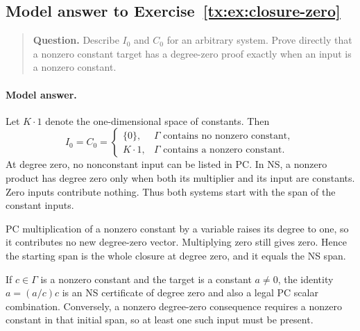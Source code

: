 \documentclass[11pt,a4paper,oneside,openany]{book}
\theoremstyle{definition}\newtheorem{definition}[theorem]{Definition}
\theoremstyle{remark}\newtheorem{remark}[theorem]{Remark}
\numberwithin{equation}{chapter}
\begin{document}
\begin{samepage}

\subsection*{Model answer to Exercise~\ref{tx:ex:closure-zero}}\label{tx:ans:closure-zero}

\begin{quote}\small\textbf{Question.} Describe $I_0$ and $C_0$ for an arbitrary system. Prove directly that a
nonzero constant target has a degree-zero proof exactly when an input
is a nonzero constant.
\end{quote}

\paragraph{Model answer.}
Let \(K\cdot1\) denote the one-dimensional space of constants.
Then
\[
 I_0=C_0=
 \begin{cases}
   \{0\},&\Gamma\text{ contains no nonzero constant},\\
   K\cdot1,&\Gamma\text{ contains a nonzero constant}.
 \end{cases}
\]
At degree zero, no nonconstant input can be listed in PC. In NS,
a nonzero product has degree zero only when both its multiplier
and its input are constants. Zero inputs contribute nothing.
Thus both systems start with the span of the constant inputs.
\end{samepage}

PC multiplication of a nonzero constant by a variable raises its
degree to one, so it contributes no new degree-zero vector. Multiplying
zero still gives zero. Hence the starting span is the whole closure
at degree zero, and it equals the NS span.

If \(c\in\Gamma\) is a nonzero constant and the target is a constant
\(a\ne0\), the identity \(a=(a/c)c\) is an NS certificate of degree
zero and also a legal PC scalar combination. Conversely, a nonzero
degree-zero consequence requires a nonzero constant in that initial
span, so at least one such input must be present.


\par
\end{document}
